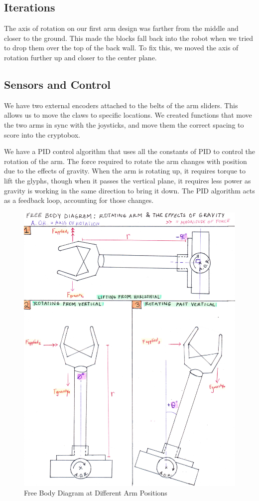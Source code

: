 \subsection*{Iterations}
The axis of rotation on our first arm design was farther from the middle and closer to the ground. This made the blocks fall back into the robot when we tried to drop them over the top of the back wall. To fix this, we moved the axis of rotation further up and closer to the center plane. 

\subsection*{Sensors and Control}
We have two external encoders attached to the belts of the arm sliders. This allows us to move the claws to specific locations. We created functions that move the two arms in sync with the joysticks, and move them the correct spacing to score into the cryptobox.

We have a PID control algorithm that uses all the constants of PID to control the rotation of the arm. The force required to rotate the arm changes with position due to the effects of gravity. When the arm is rotating up, it requires torque to lift the glyphs, though when it passes the vertical plane, it requires less power as gravity is working in the same direction to bring it down. The PID algorithm acts as a feedback loop, accounting for those changes.

\begin{figure}[htp]
\centering
\includegraphics[width=.7\linewidth]{Design_Overview/FBD_good_arm.pdf}
\caption{Free Body Diagram at Different Arm Positions}
\label{fig:FBD_Arm}
\end{figure}


